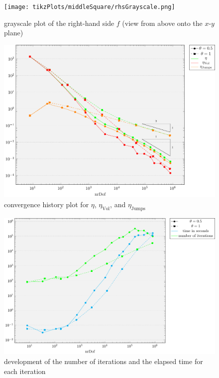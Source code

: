 \documentclass[draft=false,twoside,12pt]{scrreprt}
\begin{document}
\begin{figure}[H]
	\centering
	\texttt{[image: tikzPlots/middleSquare/rhsGrayscale.png]}
  \caption{grayscale plot of the right-hand side $f$ (view from above onto the
  $x$-$y$ plane)}
  \label{fig:rhsMiddleSquare}
\end{figure}

\begin{figure}[H]
	\centering
	\includegraphics[width=16cm]
  {tikzPlots/middleSquare/convergence.pdf}
  \caption{convergence history plot for $\eta$,
  $\eta_\text{Vol}$, and $\eta_\text{Jumps}$}
\end{figure}

\begin{figure}[H]
	\centering
	\includegraphics[width=16cm]{tikzPlots/middleSquare/misc.pdf}
  \caption{development of the number of iterations and the elapsed time for 
  each iteration}
\end{figure}
\end{document}
